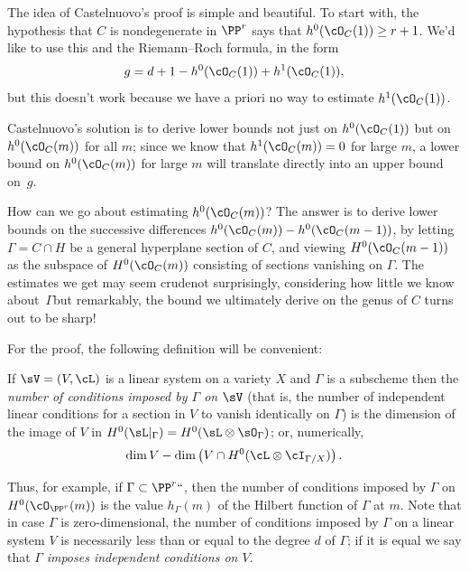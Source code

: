 The idea of Castelnuovo's proof is simple and beautiful. To start
with, the hypothesis that $C$ is nondegenerate in $\PP^r$ says that
$h^0(\cO_C(1)) \geq r+1$. We'd like to use this and the Riemann--Roch
formula, in the form
$$
g = d+1 - h^0(\cO_C(1)) + h^1(\cO_C(1)),
$$
but this doesn't work because we have a priori no way to estimate
$h^1(\cO_C(1))$.

Castelnuovo's solution  is to derive lower bounds not just on
$h^0(\cO_C(1))$ but on $h^0(\cO_C(m))$ for all $m$; since we know that
$h^1(\cO_C(m)) = 0$ for large $m$, a lower bound on $h^0(\cO_C(m))$
for large $m$ will translate directly into an upper bound on~$g$.

How can we go about estimating $h^0(\cO_C(m))$? The answer is to
derive lower bounds on the successive differences $h^0(\cO_C(m)) -
h^0(\cO_C(m-1))$, by letting $\Gamma = C \cap H$ be a general hyperplane
section of $C$, and viewing $H^0(\cO_C(m-1))$ as the subspace of
$H^0(\cO_C(m))$ consisting of sections vanishing on $\Gamma$. The
estimates we get may seem crude\emdash not surprisingly, considering
how little we know about~$\Gamma$\emdash but remarkably, the bound we
ultimately derive on the genus of $C$ turns out to be sharp!

For the proof, the following definition will be convenient:

\begin{definition}
If $\sV = (V,\cL)$ is a linear system on a variety $X$ and $\Gamma$
is a subscheme then the \emph{number of conditions imposed by $\Gamma$
%
on $\sV$} (that is, the number of
independent linear conditions
%
for a
section in $V$ to vanish
identically on $\Gamma$) is the dimension of the image of $V$ in
$H^0(\sL|_\Gamma) = H^0(\sL \otimes \sO_\Gamma)$; or, numerically,
$$
\dim V - \dim \left(V \cap H^0(\cL\otimes \cI_{\Gamma/X}) \right).
$$
\end{definition}

Thus, for example, if $\Gamma \subset \PP^r` `$, then the number of
conditions imposed by $\Gamma$ on $H^0(\cO_{\PP^r}(m))$ is the value
$h_\Gamma(m)$ of the Hilbert function of $\Gamma$ at $m$.
Note that in case $\Gamma$ is zero-dimensional, the number of conditions
imposed by $\Gamma$ on a linear system $V$ is necessarily less than or
equal to the degree $d$ of $\Gamma$; if it is equal we say that $\Gamma$
\emph{imposes independent conditions on $V$}.

